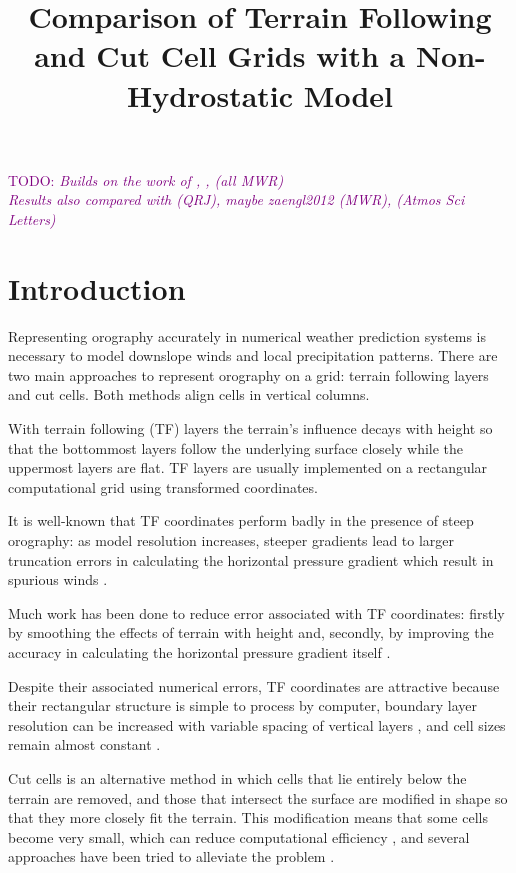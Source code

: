 \documentclass[twocol]{ametsoc}
\title{Comparison of Terrain Following and Cut Cell Grids with a Non-Hydrostatic Model}
\affiliation{}
\begin{document}
\newcommand{\TODO}[1]{\textcolor{purple}{TODO: \emph{#1}}}

\maketitle

\TODO{Builds on the work of \citet{schaer2002}, \citet{klemp2011}, \citet{weller-shahrokhi2014} (all MWR) \\
Results also compared with \citet{melvin2010} (QRJ), maybe zaengl2012 (MWR), \citet{good2014} (Atmos Sci Letters)}

\section{Introduction}
Representing orography accurately in numerical weather prediction systems is necessary to model downslope winds and local precipitation patterns.  There are two main approaches to represent orography on a grid: terrain following layers and cut cells.  Both methods align cells in vertical columns.

With terrain following (TF) layers the terrain's influence decays with height so that the bottommost layers follow the underlying surface closely while the uppermost layers are flat.  TF layers are usually implemented on a rectangular computational grid using transformed coordinates.

It is well-known that TF coordinates perform badly in the presence of steep orography: as model resolution increases, steeper gradients lead to larger truncation errors in calculating the horizontal pressure gradient which result in spurious winds \citep{dempsey-davis1998,steppeler2002}.

Much work has been done to reduce error associated with TF coordinates: firstly by smoothing the effects of terrain with height \citep{schaer2002,klemp2011} and, secondly, by improving the accuracy in calculating the horizontal pressure gradient itself \citep{klemp2011,zaengl2012}.

Despite their associated numerical errors, TF coordinates are attractive because their rectangular structure is simple to process by computer, boundary layer resolution can be increased with variable spacing of vertical layers \citep{schaer2002}, and cell sizes remain almost constant \citep{jebens2011}.

Cut cells is an alternative method in which cells that lie entirely below the terrain are removed, and those that intersect the surface are modified in shape so that they more closely fit the terrain.  This modification means that some cells become very small, which can reduce computational efficiency \citep{klein2009}, and several approaches have been tried to alleviate the problem \citep{steppeler2002,yamazaki-satomura2010,jebens2011}.
\end{document}
